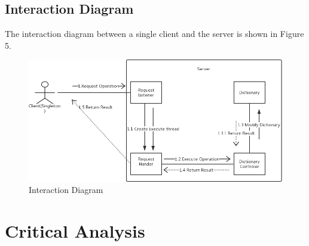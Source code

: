 \documentclass[a4paper]{article}
\begin{document}
\subsection{Interaction Diagram}
The interaction diagram between a single client and the server is shown in Figure 5.
\begin{figure}[H]
	\includegraphics[width=\linewidth]{InteractionDiagram.png}
	\caption{Interaction Diagram}
\end{figure}

\section{Critical Analysis}
\end{document}
